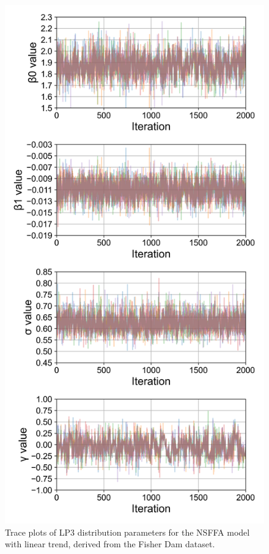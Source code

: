 \begin{figure}[H]
    \centering
    \includegraphics[width=1\linewidth]{_plots/OCD_linear_mu_posterior_trace_lp3.png}
    \caption{Trace plots of LP3 distribution parameters for the NSFFA model with linear trend, derived from the Fisher Dam dataset.}
    \label{fig:OCD_linear_mu_posterior_trace_lp3}
\end{figure}

